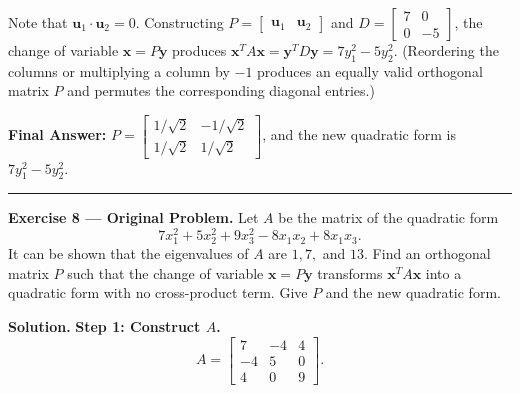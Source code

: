 \documentclass[11pt, letterpaper]{article}
\theoremstyle{definition}
\theoremstyle{remark}
\begin{document}
Note that $\mathbf{u}_1 \cdot \mathbf{u}_2 = 0$. Constructing $P = \begin{bmatrix} \mathbf{u}_1 & \mathbf{u}_2 \end{bmatrix}$ and $D = \begin{bmatrix} 7 & 0 \\ 0 & -5 \end{bmatrix}$, the change of variable $\mathbf{x} = P\mathbf{y}$ produces $\mathbf{x}^T A \mathbf{x} = \mathbf{y}^T D \mathbf{y} = 7y_1^2 - 5y_2^2$. (Reordering the columns or multiplying a column by $-1$ produces an equally valid orthogonal matrix $P$ and permutes the corresponding diagonal entries.)

\textbf{Final Answer:} $P = \begin{bmatrix} 1/\sqrt{2} & -1/\sqrt{2} \\ 1/\sqrt{2} & 1/\sqrt{2} \end{bmatrix}$, and the new quadratic form is $7y_1^2 - 5y_2^2$.

\medskip
\hrule
\medskip

\textbf{Exercise 8 --- Original Problem.} Let $A$ be the matrix of the quadratic form
\[
7x_1^2 + 5x_2^2 + 9x_3^2 - 8x_1x_2 + 8x_1x_3.
\]
It can be shown that the eigenvalues of $A$ are $1, 7,$ and $13$. Find an orthogonal matrix $P$ such that the change of variable $\mathbf{x} = P\mathbf{y}$ transforms $\mathbf{x}^T A \mathbf{x}$ into a quadratic form with no cross-product term. Give $P$ and the new quadratic form.

\textbf{Solution.}
\textbf{Step 1: Construct $A$.}
\[
A = \begin{bmatrix} 7 & -4 & 4 \\ -4 & 5 & 0 \\ 4 & 0 & 9 \end{bmatrix}.
\]
\end{document}
